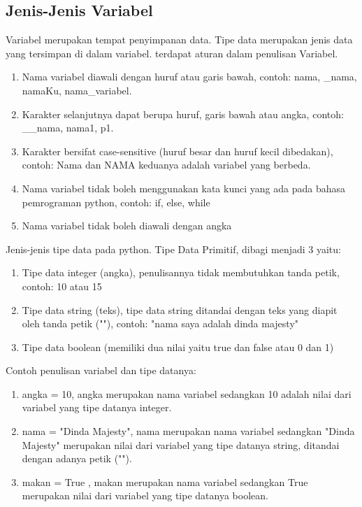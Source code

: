 \subsection{Jenis-Jenis Variabel}
Variabel merupakan tempat penyimpanan data. Tipe data merupakan jenis data yang tersimpan di dalam variabel. terdapat aturan dalam penulisan Variabel.
\begin{enumerate}
 \item Nama variabel diawali dengan huruf atau garis bawah, contoh: nama, \_nama, namaKu, nama\_variabel.
 \item Karakter selanjutnya dapat berupa huruf, garis bawah atau angka, contoh: \_\_nama, nama1, p1.
 \item Karakter bersifat case-sensitive (huruf besar dan huruf kecil dibedakan), contoh: Nama dan NAMA keduanya adalah variabel yang berbeda.
 \item Nama variabel tidak boleh menggunakan kata kunci yang ada pada bahasa pemrograman python, contoh: if, else, while
 \item Nama variabel tidak boleh diawali dengan angka
\end{enumerate}

Jenis-jenis tipe data pada python.
Tipe Data Primitif, dibagi menjadi 3 yaitu:
\begin{enumerate}
 \item Tipe data integer (angka), penulisannya tidak membutuhkan tanda petik, contoh: 10 atau 15
 \item Tipe data string (teks), tipe data string ditandai dengan teks yang diapit oleh tanda petik (""), contoh: "nama saya adalah dinda majesty"
 \item Tipe data boolean (memiliki dua nilai yaitu true dan false atau 0 dan 1)
\end{enumerate}

Contoh penulisan variabel dan tipe datanya:
\begin{enumerate}
 \item angka = 10, angka merupakan nama variabel sedangkan 10 adalah nilai dari variabel yang tipe datanya integer.
 \item nama = "Dinda Majesty", nama merupakan nama variabel sedangkan "Dinda Majesty" merupakan nilai dari variabel yang tipe datanya string, ditandai dengan adanya petik ("").
 \item makan = True , makan merupakan nama variabel sedangkan True merupakan nilai dari variabel yang tipe datanya boolean.
\end{enumerate}

